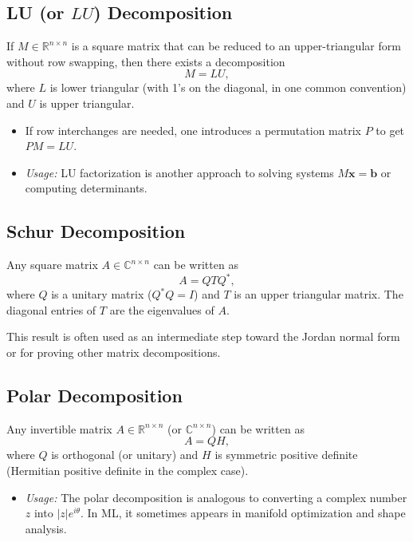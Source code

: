 \subsection{LU (or $LU$) Decomposition}
\begin{theorem}[LU Decomposition]
If $M \in \mathbb{R}^{n \times n}$ is a square matrix that can be reduced to an upper-triangular form 
without row swapping, then there exists a decomposition
\[
M = LU,
\]
where $L$ is lower triangular (with 1's on the diagonal, in one common convention) 
and $U$ is upper triangular.
\end{theorem}
\begin{itemize}
    \item If row interchanges are needed, one introduces a permutation matrix $P$ to get $PM = LU$.
    \item \emph{Usage:} 
          LU factorization is another approach to solving systems $M \mathbf{x} = \mathbf{b}$ or computing determinants.
\end{itemize}

\subsection{Schur Decomposition}
\begin{theorem}
Any square matrix $A \in \mathbb{C}^{n \times n}$ can be written as 
\[
A = Q T Q^*,
\]
where $Q$ is a unitary matrix ($Q^* Q = I$) and $T$ is an upper triangular matrix. 
The diagonal entries of $T$ are the eigenvalues of $A$.
\end{theorem}
\noindent
This result is often used as an intermediate step toward the Jordan normal form or for proving other matrix decompositions.

\subsection{Polar Decomposition}
Any invertible matrix $A \in \mathbb{R}^{n \times n}$ (or $\mathbb{C}^{n \times n}$) can be written as 
\[
A = Q H,
\]
where $Q$ is orthogonal (or unitary) and $H$ is symmetric positive definite (Hermitian positive definite in the complex case).
\begin{itemize}
    \item \emph{Usage:} 
          The polar decomposition is analogous to converting a complex number $z$ into $|z|e^{i\theta}$. 
          In ML, it sometimes appears in manifold optimization and shape analysis.
\end{itemize}

